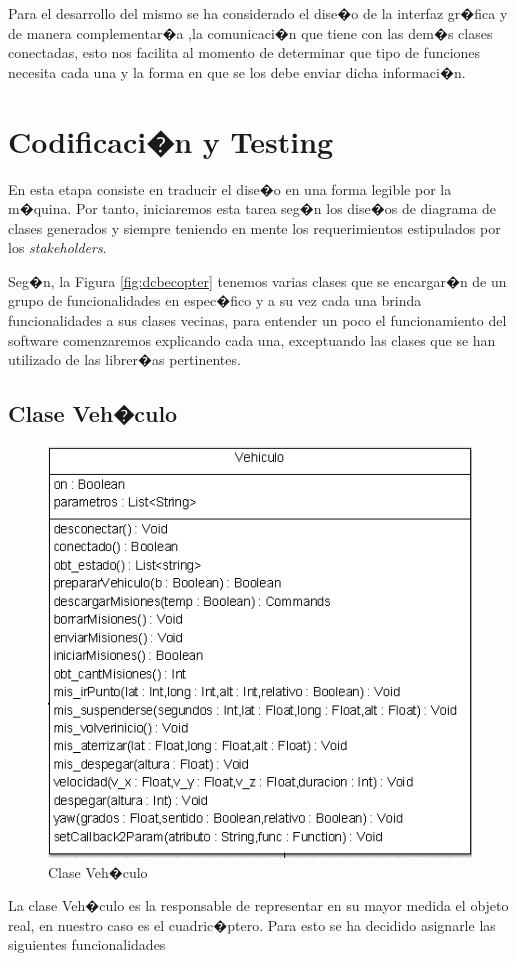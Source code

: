 Para el desarrollo del mismo se ha considerado el dise�o de la interfaz gr�fica y de manera complementar�a ,la comunicaci�n que tiene con las dem�s clases conectadas, esto nos facilita al momento de determinar que tipo de funciones necesita cada una y la forma en que se los debe enviar dicha informaci�n.  


\newpage

\section{Codificaci�n y Testing}

En esta etapa consiste en traducir el dise�o en una forma legible por la m�quina. Por tanto, iniciaremos esta tarea seg�n los dise�os de diagrama de clases generados y siempre teniendo en mente los requerimientos estipulados por los \textit{stakeholders}.

\par Seg�n,  la Figura \ref{fig:dcbecopter} tenemos varias clases que se encargar�n de un grupo de funcionalidades en espec�fico y a su vez cada una brinda funcionalidades a sus clases vecinas, para entender un poco el funcionamiento del software comenzaremos explicando cada una, exceptuando las clases que se han utilizado de las librer�as pertinentes.


\subsection{Clase Veh�culo}

\begin{figure}[h]
	\centering
	\includegraphics[width=0.3\linewidth, height=0.2\textheight]{Imagenes/classVehiculo}
	\caption{Clase Veh�culo}
	\label{fig:classvehiculo}
\end{figure}

La clase Veh�culo es la responsable de representar en su mayor medida el objeto real, en nuestro caso es el cuadric�ptero.  Para esto se ha decidido asignarle las siguientes funcionalidades 

